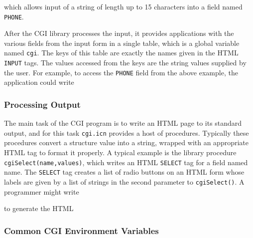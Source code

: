 {

\noindent
which allows input of a string of length up to 15 characters into a
field named \texttt{PHONE}.

After the CGI library processes the input, it provides applications with
the various fields from the input form in a single table, which is a
global variable named \texttt{cgi}. The keys of this table are exactly
the names given in the HTML \texttt{INPUT} tags. The values accessed
from the keys are the string values supplied by the user. For example,
to access the \texttt{PHONE} field from the above example, the
application could write 


\subsubsection{Processing Output}

The main task of the CGI program is to write an HTML page to its
standard output, and for this task \texttt{cgi.icn} provides a host of
procedures. Typically these procedures convert a structure value into a
string, wrapped with an appropriate HTML tag to format it properly. A
typical example is the library procedure
\texttt{cgiSelect(name,values)}, which writes an HTML \texttt{SELECT}
tag for a field named name. The \texttt{SELECT} tag creates a list of
radio buttons on an HTML form whose labels are given by a list of
strings in the second parameter to \texttt{cgiSelect()}. A programmer
might write


to generate the HTML


\subsubsection[Common CGI Environment Variables]{Common CGI Environment
Variables}

}
